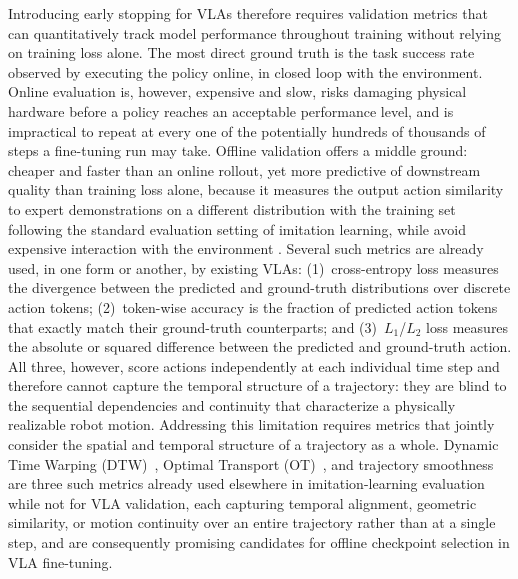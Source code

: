 \documentclass[11pt]{article}
\numberwithin{equation}{section}
\numberwithin{table}{section}
\numberwithin{figure}{section}
\begin{document}
Introducing early stopping for VLAs therefore requires validation metrics that can quantitatively track
model performance throughout training without relying on training loss alone. The most direct ground
truth is the task success rate observed by executing the policy online, in closed loop with the
environment. Online evaluation is, however, expensive and slow, risks damaging physical hardware before a
policy reaches an acceptable performance level, and is impractical to repeat at every one of the
potentially hundreds of thousands of steps a fine-tuning run may take. Offline validation offers a
middle ground: cheaper and faster than an online rollout, yet more predictive of downstream quality than
training loss alone, because it measures the output action similarity to expert demonstrations on a different distribution with the training set following the standard evaluation
setting of imitation learning, while avoid expensive interaction with the environment \cite{il}. Several such metrics are already used, in
one form or another, by existing VLAs: (1)~cross-entropy loss measures the divergence between the
predicted and ground-truth distributions over discrete action tokens; (2)~token-wise accuracy is
the fraction of predicted action tokens that exactly match their ground-truth counterparts; and
(3)~$L_1$/$L_2$ loss measures the absolute or squared difference between the predicted and
ground-truth action. All three, however, score actions independently at each individual time step and therefore cannot capture the temporal structure of
a trajectory: they are blind to the sequential dependencies and continuity that characterize a physically
realizable robot motion. Addressing this limitation requires metrics that jointly consider the spatial and
temporal structure of a trajectory as a whole. Dynamic Time Warping (DTW)~\cite{dtw_il}, Optimal Transport
(OT)~\cite{ot_il}, and trajectory smoothness~\cite{smoothness_il} are three such metrics already used
elsewhere in imitation-learning evaluation while not for VLA validation, each capturing temporal alignment, geometric similarity, or
motion continuity over an entire trajectory rather than at a single step, and are consequently promising candidates for offline checkpoint
selection in VLA fine-tuning. 
\end{document}
